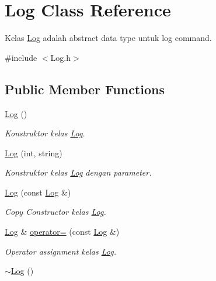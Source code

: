 \hypertarget{class_log}{}\section{Log Class Reference}
\label{class_log}


Kelas \hyperlink{class_log}{Log} adalah abstract data type untuk log command.  




{\ttfamily \#include $<$Log.\+h$>$}

\subsection*{Public Member Functions}
\begin{DoxyCompactItemize}
\item 
\hypertarget{class_log_af6071a60aa52b6c1b511f99b4bc1b8fe}{}\hyperlink{class_log_af6071a60aa52b6c1b511f99b4bc1b8fe}{Log} ()\label{class_log_af6071a60aa52b6c1b511f99b4bc1b8fe}

\begin{DoxyCompactList}\small\item\em Konstruktor kelas \hyperlink{class_log}{Log}. \end{DoxyCompactList}\item 
\hyperlink{class_log_a0f45072d0b622c4d4f70bb0ef63bef42}{Log} (int, string)
\begin{DoxyCompactList}\small\item\em Konstruktor kelas \hyperlink{class_log}{Log} dengan parameter. \end{DoxyCompactList}\item 
\hyperlink{class_log_a60fc11c5c263c4bfad3f9561a4881a13}{Log} (const \hyperlink{class_log}{Log} \&)
\begin{DoxyCompactList}\small\item\em Copy Constructor kelas \hyperlink{class_log}{Log}. \end{DoxyCompactList}\item 
\hyperlink{class_log}{Log} \& \hyperlink{class_log_a91f9df208ee0515b6403210497d37ee4}{operator=} (const \hyperlink{class_log}{Log} \&)
\begin{DoxyCompactList}\small\item\em Operator assignment kelas \hyperlink{class_log}{Log}. \end{DoxyCompactList}\item 
\hypertarget{class_log_a0fbfda88fbee5027c89f6eb121059360}{}\hyperlink{class_log_a0fbfda88fbee5027c89f6eb121059360}{$\sim$\+Log} ()\label{class_log_a0fbfda88fbee5027c89f6eb121059360}


\end{DoxyCompactItemize}
